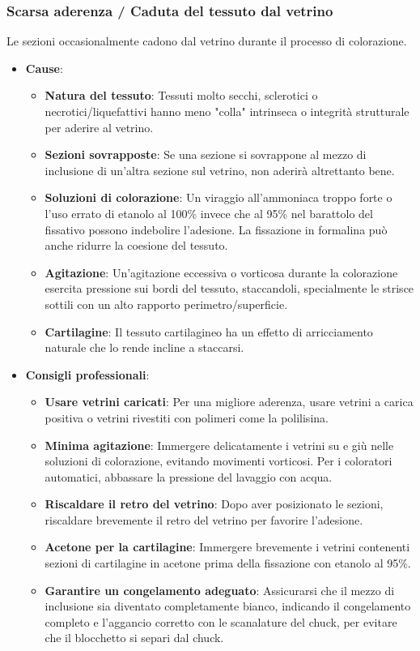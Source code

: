 \subsubsection{Scarsa aderenza / Caduta del tessuto dal vetrino}
Le sezioni occasionalmente cadono dal vetrino durante il processo di colorazione. 
\begin{itemize}
    \item   \textbf{Cause}:
    \begin{itemize}
        \item   \textbf{Natura del tessuto}: Tessuti molto secchi, sclerotici o necrotici/liquefattivi hanno meno "colla" intrinseca o integrità strutturale per aderire al vetrino. 
        \item   \textbf{Sezioni sovrapposte}: Se una sezione si sovrappone al mezzo di inclusione di un'altra sezione sul vetrino, non aderirà altrettanto bene. 
        \item   \textbf{Soluzioni di colorazione}: Un viraggio all'ammoniaca troppo forte o l'uso errato di etanolo al 100\% invece che al 95\% nel barattolo del fissativo possono indebolire l'adesione.  La fissazione in formalina può anche ridurre la coesione del tessuto.
        \item   \textbf{Agitazione}: Un'agitazione eccessiva o vorticosa durante la colorazione esercita pressione sui bordi del tessuto, staccandoli, specialmente le strisce sottili con un alto rapporto perimetro/superficie. 
        \item   \textbf{Cartilagine}: Il tessuto cartilagineo ha un effetto di arricciamento naturale che lo rende incline a staccarsi. 
    \end{itemize}
    \item   \textbf{Consigli professionali}:
    \begin{itemize}
        \item   \textbf{Usare vetrini caricati}: Per una migliore aderenza, usare vetrini a carica positiva o vetrini rivestiti con polimeri come la polilisina. 
        \item   \textbf{Minima agitazione}: Immergere delicatamente i vetrini su e giù nelle soluzioni di colorazione, evitando movimenti vorticosi.  Per i coloratori automatici, abbassare la pressione del lavaggio con acqua.
        \item   \textbf{Riscaldare il retro del vetrino}: Dopo aver posizionato le sezioni, riscaldare brevemente il retro del vetrino per favorire l'adesione. 
        \item   \textbf{Acetone per la cartilagine}: Immergere brevemente i vetrini contenenti sezioni di cartilagine in acetone prima della fissazione con etanolo al 95\%. 
        \item   \textbf{Garantire un congelamento adeguato}: Assicurarsi che il mezzo di inclusione sia diventato completamente bianco, indicando il congelamento completo e l'aggancio corretto con le scanalature del chuck, per evitare che il blocchetto si separi dal chuck. 
    \end{itemize}
\end{itemize}

